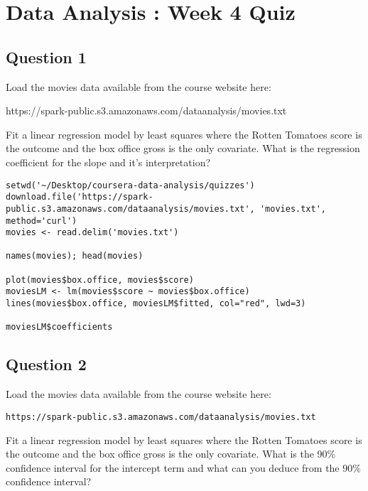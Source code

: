 \documentclass[12pt]{article}
\begin{document}
\section{Data Analysis : Week 4 Quiz}

\subsection*{Question 1}
Load the movies data available from the course website here: 

https://spark-public.s3.amazonaws.com/dataanalysis/movies.txt

Fit a linear regression model by least squares where the Rotten Tomatoes score
is the outcome and the box office gross is the only covariate. What is the
regression coefficient for the slope and it's interpretation?

\begin{verbatim}
setwd('~/Desktop/coursera-data-analysis/quizzes')
download.file('https://spark-public.s3.amazonaws.com/dataanalysis/movies.txt', 'movies.txt', method='curl')
movies <- read.delim('movies.txt')

names(movies); head(movies)

plot(movies$box.office, movies$score)
moviesLM <- lm(movies$score ~ movies$box.office)
lines(movies$box.office, moviesLM$fitted, col="red", lwd=3)

moviesLM$coefficients
\end{verbatim}

\subsection*{Question 2}

Load the movies data available from the course website here: 

\begin{verbatim}
https://spark-public.s3.amazonaws.com/dataanalysis/movies.txt
\end{verbatim}

Fit a linear regression model by least squares where the Rotten Tomatoes score
is the outcome and the box office gross is the only covariate. What is the 90\%
confidence interval for the intercept term and what can you deduce from the 90\%
confidence interval?
\end{document}
